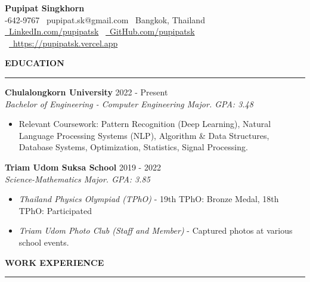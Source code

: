 \documentclass[a4paper, 11pt]{article}
\begin{document}
\begin{center}
    {\Large \textbf{Pupipat Singkhorn}} \\
    -642-9767 \textbullet\ pupipat.sk@gmail.com \textbullet\ Bangkok, Thailand
    \\
    \href{www.linkedin.com/in/pupipatsk}{\faLinkedin\ LinkedIn.com/pupipatsk}
    \textbullet\ \href{https://github.com/pupipatsk}{\faGithub\ GitHub.com/pupipatsk}
    \textbullet\ \href{https://pupipatsk.vercel.app}{\faGlobe\ https://pupipatsk.vercel.app}
\end{center}

\textbf{EDUCATION}
\vspace{5pt}
{\hrule}
\vspace{6pt}

\textbf{Chulalongkorn University} \hfill 2022 - Present\\
\textit{Bachelor of Engineering - Computer Engineering Major. GPA: 3.48}
\begin{itemize}[noitemsep, topsep=0pt, partopsep=0pt, parsep=0pt, leftmargin=20pt]
    \item Relevant Coursework: Pattern Recognition (Deep Learning), Natural Language Processing Systems (NLP), Algorithm \& Data Structures, Database Systems, Optimization, Statistics, Signal Processing.
\end{itemize}

\vspace{2pt}

\textbf{Triam Udom Suksa School} \hfill 2019 - 2022\\
\textit{Science-Mathematics Major. GPA: 3.85}
\begin{itemize}[noitemsep, topsep=0pt, partopsep=0pt, parsep=0pt, leftmargin=20pt]
    \item \textit{Thailand Physics Olympiad (TPhO)} - 19th TPhO: Bronze Medal, 18th TPhO: Participated
    \item \textit{Triam Udom Photo Club (Staff and Member)} - Captured photos at various school events.
\end{itemize}

\vspace{6pt}
\textbf{WORK EXPERIENCE}
\vspace{5pt}
{\hrule}
\vspace{6pt}
\end{document}
